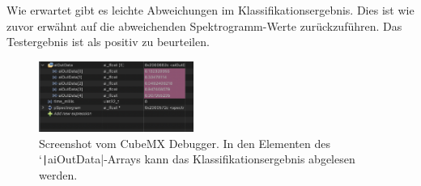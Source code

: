 \begin{adjustwidth}{0.5cm}{0cm}
Wie erwartet gibt es leichte Abweichungen im Klassifikationsergebnis. Dies ist wie zuvor erwähnt auf die abweichenden Spektrogramm-Werte zurückzuführen. Das Testergebnis ist als positiv zu beurteilen. 

\begin{figure}[h!]
\centering
\includegraphics[width=0.45\textwidth]{images/10_test_validierung/nn/nn-debuger-classification-result.png}
\caption{Screenshot vom CubeMX Debugger. In den Elementen des `\texttt|aiOutData|-Arrays kann das Klassifikationsergebnis abgelesen werden.}
\label{fig:img-stm-classification-result}
\end{figure}

\end{adjustwidth}

